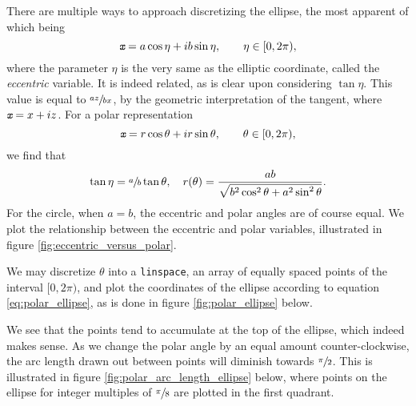 There are multiple ways to approach discretizing the ellipse, the most apparent of which being
\begin{equation}\label{eq:parametric_ellipse}
  {\textit{\texttt{x}}} = a\cos{\eta} + ib\sin{\eta}, \qquad \eta \in [0, 2\pi),
\end{equation}
where the parameter $\eta$ is the very same as the elliptic coordinate, called the \emph{eccentric} variable.
It is indeed related, as is clear upon considering $\tan{\eta}$.
This value is equal to $\sfrac{az}{bx}$, by the geometric interpretation of the tangent, where ${\textit{\texttt{x}}} = x + iz$.
For a polar representation
\begin{equation}\label{eq:polar_ellipse}
{\textit{\texttt{x}}} = r\cos{\theta} + ir\sin{\theta}, \qquad \theta \in [0, 2\pi),
\end{equation}
we find that
\[
\tan{\eta} = \sfrac{a}{b} \tan{\theta}, \quad r(\theta) = \frac{ab}{\sqrt{b^2 \cos^2{\theta} + a^2 \sin^2{\theta}}}.
\]
For the circle, when $a = b$, the eccentric and polar angles are of course equal.
We plot the relationship between the eccentric and polar variables, illustrated in figure \ref{fig:eccentric_versus_polar}.
\begin{Figure}
  \centering
  \scalebox{1}{%
    
  }
  \captionsetup{type = figure}
  \caption{Relationship between the eccentric variable $\eta$ and polar variable $\theta$. Dashed line is $b = \sfrac{a}{10}$, whole line is $b = \sfrac{a}{2}$.}
  \label{fig:eccentric_versus_polar}
\end{Figure}
We may discretize $\theta$ into a \texttt{linspace}, an array of equally spaced points of the interval $[0, 2\pi)$, and plot the coordinates of the ellipse according to equation \eqref{eq:polar_ellipse}, as is done in figure \ref{fig:polar_ellipse} below.
\begin{Figure}
  \centering
  \scalebox{1}{%
    
  }
  \captionsetup{type = figure}
  \caption{Ellipse parametrized with the polar variable $\theta$, according to equation \eqref{eq:polar_ellipse}.}
  \label{fig:polar_ellipse}
\end{Figure}
We see that the points tend to accumulate at the top of the ellipse, which indeed makes sense.
As we change the polar angle by an equal amount counter-clockwise, the arc length drawn out between points will diminish towards $\sfrac{\pi}{2}$.
This is illustrated in figure \ref{fig:polar_arc_length_ellipse} below, where points on the ellipse for integer multiples of $\sfrac{\pi}{8}$ are plotted in the first quadrant.
\begin{Figure}
  \centering
  \scalebox{1}{%
    
  }
  \captionsetup{type = figure}
  \caption{Demonstration that the arc length between points decreases counter-clockwise in the first quadrant as the polar angle $\theta$ approaches $\sfrac{\pi}{2}$.}
  \label{fig:polar_arc_length_ellipse}
\end{Figure}
